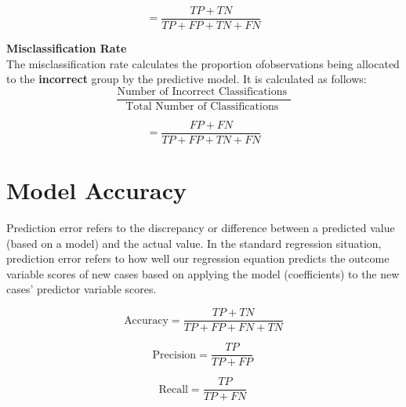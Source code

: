 \[ = \frac{TP + TN}{TP+FP+TN+FN}\]

\medskip

\noindent \textbf{Misclassification Rate}\\
The misclassification rate calculates the proportion ofobservations being allocated to the \textbf{incorrect} group by the predictive model. It is calculated as follows:
\[ \frac{
\mbox{Number of Incorrect Classifications }}{\mbox{Total Number of Classifications }} \]

\[ = \frac{FP + FN}{TP+FP+TN+FN}\]
\newpage
\newpage
\section{Model Accuracy}
Prediction error refers to the discrepancy or difference between a predicted value (based on a
model) and the actual value. In the standard regression situation, prediction error refers to how
well our regression equation predicts the outcome variable scores of new cases based on
applying the model (coefficients) to the new cases’ predictor variable scores.

\begin{equation}
\text{Accuracy}=\frac{TP+TN}{TP+FP+FN+TN}
\end{equation}

\begin{equation}
\text{Precision}=\frac{TP}{TP+FP} \, 
\end{equation}

\begin{equation}
\text{Recall}=\frac{TP}{TP+FN} \, 
\end{equation}

